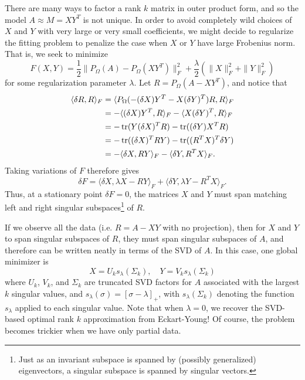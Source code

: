 \documentclass[12pt, leqno]{article} %
\begin{document}
There are many ways to factor a rank $k$ matrix in outer product
form, and so the model $A \approx M = XY^T$ is not unique.  In order
to avoid completely wild choices of $X$ and $Y$ with very large
or very small coefficients, we might decide to regularize the
fitting problem to penalize the case when $X$ or $Y$ have large
Frobenius norm.  That is, we seek to minimize
\[
  F(X,Y) =
    \frac{1}{2} \|P_{\Omega}(A)-P_{\Omega}(XY^T)\|_F^2 +
    \frac{\lambda}{2} \left( \|X\|_F^2 + \|Y\|_F^2 \right)
\]
for some regularization parameter $\lambda$.  Let
$R = P_{\Omega}(A-XY^T)$, and notice that
\begin{align*}
  \langle \delta R, R \rangle_F
  &= \langle P_{\Omega}(-(\delta X) Y^T - X(\delta Y)^T ) R, R \rangle_F \\
  &= -\langle (\delta X) Y^T, R \rangle_F -\langle X (\delta Y)^T, R \rangle_F \\
  &= -\operatorname{tr}(Y (\delta X)^T R)-\operatorname{tr}((\delta Y) X^T R) \\
  &= -\operatorname{tr}((\delta X)^T RY)-\operatorname{tr}((R^TX)^T \delta Y) \\
  &= -\langle \delta X, RY \rangle_F - \langle \delta Y, R^T X \rangle_F.
\end{align*}
Taking variations of $F$ therefore gives
\[
  \delta F =
    \langle \delta X, \lambda X - R   Y \rangle_F +
    \langle \delta Y, \lambda Y - R^T X \rangle_F.
\]
Thus, at a stationary point $\delta F = 0$,     
the matrices $X$ and $Y$ must span matching left and right
singular subspaces\footnote{%
  Just as an invariant subspace is spanned by (possibly generalized)
  eigenvectors, a singular subspace is spanned by singular vectors.
}
of $R$.

If we observe all the data (i.e. $R=A-XY$ with no projection),
then for $X$ and $Y$ to span singular subspaces of $R$, they must
span singular subspaces of $A$, and therefore can be written neatly
in terms of the SVD of $A$.  In this case, one global minimizer is
\[
  X = U_k s_{\lambda}(\Sigma_k), \quad Y = V_k s_{\lambda}(\Sigma_k)
\]
where $U_k$, $V_k$, and $\Sigma_k$ are truncated SVD factors for
$A$ associated with the largest $k$ singular values,
and $s_{\lambda}(\sigma) = [\sigma-\lambda]_+$,
with $s_{\lambda}(\Sigma_k)$ denoting the function $s_{\lambda}$
applied to each singular value.  Note that when $\lambda = 0$,
we recover the SVD-based optimal rank $k$ approximation from
Eckart-Young!  Of course, the problem becomes
trickier when we have only partial data.
\end{document}
